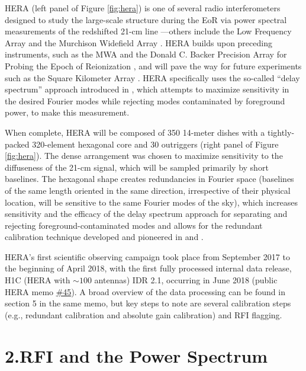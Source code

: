 \documentclass[12pt]{article}
\begin{document}
HERA (left panel of Figure \ref{fig:hera}) is one of several radio interferometers designed to study the large-scale structure during the EoR via power spectral measurements of the redshifted 21-cm line \citep{deboer2017}---others include the Low Frequency Array \citep[LOFAR;][]{vanHaarlem2013} and the Murchison Widefield Array \citep[MWA;][]{tingay2013}. HERA builds upon preceding instruments, such as the MWA and the Donald C. Backer Precision Array for Probing the Epoch of Reionization \citep[PAPER;][]{parsons2010}, and will pave the way for future experiments such as the Square Kilometer Array \cite[SKA; e.g.,][]{mellema2013}. HERA specifically uses the so-called ``delay spectrum'' approach introduced in \cite{parsons2012}, which attempts to maximize sensitivity in the desired Fourier modes while rejecting modes contaminated by foreground power, to make this measurement.

When complete, HERA will be composed of 350 14-meter dishes with a tightly-packed 320-element hexagonal core and 30 outriggers (right panel of Figure \ref{fig:hera}). The dense arrangement was chosen to maximize sensitivity to the diffuseness of the 21-cm signal, which will be sampled primarily by short baselines. The hexagonal shape creates redundancies in Fourier space (baselines of the same length oriented in the same direction, irrespective of their physical location, will be sensitive to the same Fourier modes of the sky), which increases sensitivity and the efficacy of the delay spectrum approach for separating and rejecting foreground-contaminated modes and allows for the redundant calibration technique developed and pioneered in \cite{liu2010} and \cite{zheng2014}.

HERA's first scientific observing campaign took place from September 2017 to the beginning of April 2018, with the first fully processed internal data release, H1C (HERA with $\sim 100$ antennas) IDR 2.1, occurring in June 2018 (public HERA memo \href{http://reionization.org/wp-content/uploads/2018/07/IDR2.1_Memo_v2.html}{\#45}). A broad overview of the data processing can be found in section 5 in the same memo, but key steps to note are several calibration steps (e.g., redundant calibration and absolute gain calibration) and RFI flagging. \vspace{3mm}

\tocless\section{\hypertarget{sec:rfipspec}{2.\hspace{0.75em}RFI and the Power Spectrum}}
\end{document}
